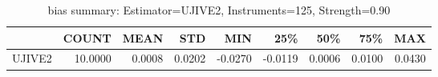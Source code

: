 \begin{table}[ht]
\centering
\caption{bias summary: Estimator=UJIVE2, Instruments=125, Strength=0.90}
\begin{tabular}{lrrrrrrrr}
\toprule
 & COUNT & MEAN & STD & MIN & 25\% & 50\% & 75\% & MAX \\
\midrule
UJIVE2 & 10.0000 & 0.0008 & 0.0202 & -0.0270 & -0.0119 & 0.0006 & 0.0100 & 0.0430 \\
\bottomrule
\end{tabular}
\end{table}
